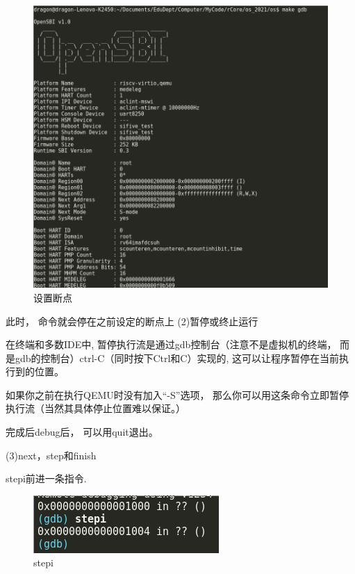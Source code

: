\begin{figure}[htb]
\centering
\includegraphics[width=\textwidth]{figures/02-02-设置断点.png}
\caption{
	设置断点
}
\label{fig:设置断点}
\end{figure}

此时， 命令就会停在之前设定的断点上
(2)暂停或终止运行

在终端和多数IDE中, 暂停执行流是通过gdb控制台（注意不是虚拟机的终端， 而是gdb的控制台）ctrl-C（同时按下Ctrl和C）实现的, 这可以让程序暂停在当前执行到的位置。

如果你之前在执行QEMU时没有加入“-S”选项， 那么你可以用这条命令立即暂停执行流（当然其具体停止位置难以保证。）

完成后debug后， 可以用quit退出。

(3)next，step和finish

stepi前进一条指令.

\begin{figure}[htb]
\centering
\includegraphics[width=\textwidth]{figures/02-02-stepi.png}
\caption{
	stepi
}
\label{fig:stepi}
\end{figure}


